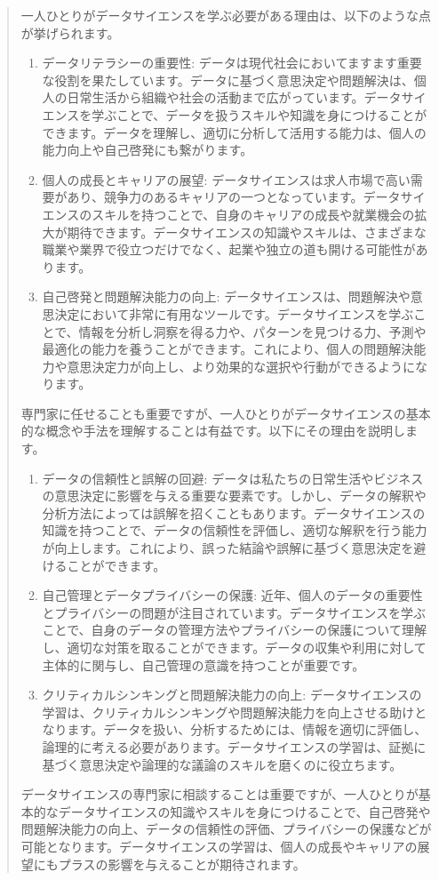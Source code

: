 \documentclass[
  xelatex, ja=standard]{bxjsbook}
\theoremstyle{definition}
\theoremstyle{definition}
\theoremstyle{definition}
\theoremstyle{definition}
\theoremstyle{remark}
\begin{document}
\begin{quote}
一人ひとりがデータサイエンスを学ぶ必要がある理由は、以下のような点が挙げられます。

\begin{enumerate}
\def\labelenumi{\arabic{enumi}.}
\item
  データリテラシーの重要性: データは現代社会においてますます重要な役割を果たしています。データに基づく意思決定や問題解決は、個人の日常生活から組織や社会の活動まで広がっています。データサイエンスを学ぶことで、データを扱うスキルや知識を身につけることができます。データを理解し、適切に分析して活用する能力は、個人の能力向上や自己啓発にも繋がります。
\item
  個人の成長とキャリアの展望: データサイエンスは求人市場で高い需要があり、競争力のあるキャリアの一つとなっています。データサイエンスのスキルを持つことで、自身のキャリアの成長や就業機会の拡大が期待できます。データサイエンスの知識やスキルは、さまざまな職業や業界で役立つだけでなく、起業や独立の道も開ける可能性があります。
\item
  自己啓発と問題解決能力の向上: データサイエンスは、問題解決や意思決定において非常に有用なツールです。データサイエンスを学ぶことで、情報を分析し洞察を得る力や、パターンを見つける力、予測や最適化の能力を養うことができます。これにより、個人の問題解決能力や意思決定力が向上し、より効果的な選択や行動ができるようになります。
\end{enumerate}

専門家に任せることも重要ですが、一人ひとりがデータサイエンスの基本的な概念や手法を理解することは有益です。以下にその理由を説明します。

\begin{enumerate}
\def\labelenumi{\arabic{enumi}.}
\setcounter{enumi}{3}
\item
  データの信頼性と誤解の回避: データは私たちの日常生活やビジネスの意思決定に影響を与える重要な要素です。しかし、データの解釈や分析方法によっては誤解を招くこともあります。データサイエンスの知識を持つことで、データの信頼性を評価し、適切な解釈を行う能力が向上します。これにより、誤った結論や誤解に基づく意思決定を避けることができます。
\item
  自己管理とデータプライバシーの保護: 近年、個人のデータの重要性とプライバシーの問題が注目されています。データサイエンスを学ぶことで、自身のデータの管理方法やプライバシーの保護について理解し、適切な対策を取ることができます。データの収集や利用に対して主体的に関与し、自己管理の意識を持つことが重要です。
\item
  クリティカルシンキングと問題解決能力の向上: データサイエンスの学習は、クリティカルシンキングや問題解決能力を向上させる助けとなります。データを扱い、分析するためには、情報を適切に評価し、論理的に考える必要があります。データサイエンスの学習は、証拠に基づく意思決定や論理的な議論のスキルを磨くのに役立ちます。
\end{enumerate}

データサイエンスの専門家に相談することは重要ですが、一人ひとりが基本的なデータサイエンスの知識やスキルを身につけることで、自己啓発や問題解決能力の向上、データの信頼性の評価、プライバシーの保護などが可能となります。データサイエンスの学習は、個人の成長やキャリアの展望にもプラスの影響を与えることが期待されます。
\end{quote}
\end{document}

